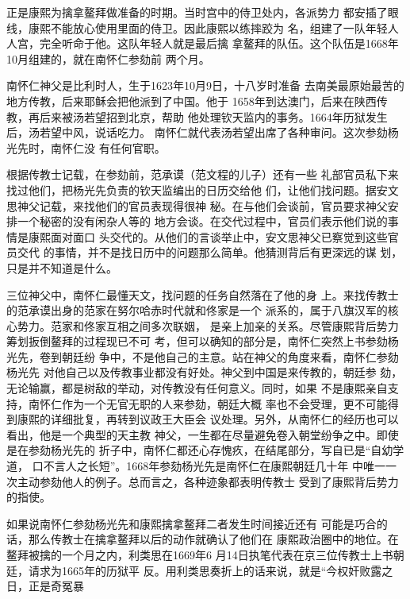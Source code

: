 正是康熙为擒拿鳌拜做准备的时期。当时宫中的侍卫处内，各派势力%
都安插了眼线，康熙不能放心使用里面的侍卫。因此康熙以练摔跤为%
名，组建了一队年轻人人宫，完全听命于他。这队年轻人就是最后擒%
拿鳌拜的队伍。这个队伍是1668年10月组建的，就在南怀仁参劾前%
两个月。%
\par
南怀仁神父是比利时人，生于1623年10月9日，十八岁时准备%
去南美最原始最苦的地方传教，后来耶稣会把他派到了中国。他于%
1658年到达澳门，后来在陕西传教，再后来被汤若望招到北京，帮助%
他处理钦天监内的事务。1664年历狱发生后，汤若望中风，说话吃力。%
南怀仁就代表汤若望出席了各种审问。这次参劾杨光先时，南怀仁没%
有任何官职。%
\par
根据传教士记载，在参劾前，范承谟（范文程的儿子）还有一些%
礼部官员私下来找过他们，把杨光先负责的钦天监编出的日历交给他%
们，让他们找问题。据安文思神父记载，来找他们的官员表现得很神%
秘。在与他们会谈前，官员要求神父安排一个秘密的没有闲杂人等的%
地方会谈。在交代过程中，官员们表示他们说的事情是康熙面对面口%
头交代的。从他们的言谈举止中，安文思神父已察觉到这些官员交代%
的事情，并不是找日历中的问题那么简单。他猜测背后有更深远的谋%
划，只是并不知道是什么。%
\par
三位神父中，南怀仁最懂天文，找问题的任务自然落在了他的身%
上。来找传教士的范承谟出身的范家在努尔哈赤时代就和佟家是一个%
派系的，属于八旗汉军的核心势力。范家和佟家互相之间多次联姻，%
是亲上加亲的关系。尽管康熙背后势力筹划扳倒鳌拜的过程现已不可%
考，但可以确知的部分是，南怀仁突然上书参劾杨光先，卷到朝廷纷%
争中，不是他自己的主意。站在神父的角度来看，南怀仁参劾杨光先%
对他自己以及传教事业都没有好处。神父到中国是来传教的，朝廷参%
劾，无论输赢，都是树敌的举动，对传教没有任何意义。同时，如果%
不是康熙亲自支持，南怀仁作为一个无官无职的人来参劾，朝廷大概%
率也不会受理，更不可能得到康熙的详细批复，再转到议政王大臣会%
议处理。另外，从南怀仁的经历也可以看出，他是一个典型的天主教%
神父，一生都在尽量避免卷入朝堂纷争之中。即使是在参劾杨光先的%
折子中，南怀仁都还心存愧疚，在结尾部分，写自已是“自幼学道，%
口不言人之长短”。1668年参劾杨光先是南怀仁在康熙朝廷几十年%
中唯一一次主动参劾他人的例子。总而言之，各种迹象都表明传教士%
受到了康熙背后势力的指使。%
\par
如果说南怀仁参劾杨光先和康熙擒拿鳌拜二者发生时间接近还有%
可能是巧合的话，那么传教士在擒拿鳌拜以后的动作就确认了他们在%
康熙政治圈中的地位。在鳌拜被擒的一个月之内，利类思在1669年6%
月14日执笔代表在京三位传教士上书朝廷，请求为1665年的历狱平%
反。用利类思奏折上的话来说，就是“今权奸败露之日，正是奇冤暴%
